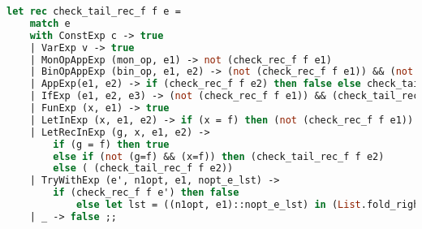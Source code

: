 \begin{lstlisting}[language=Caml, caption=Tail recursion for PicoML expressions]
let rec check_tail_rec_f f e =
    match e
    with ConstExp c -> true
    | VarExp v -> true
    | MonOpAppExp (mon_op, e1) -> not (check_rec_f f e1) 
    | BinOpAppExp (bin_op, e1, e2) -> (not (check_rec_f f e1)) && (not (check_rec_f f e2))
    | AppExp(e1, e2) -> if (check_rec_f f e2) then false else check_tail_rec_f f e1
    | IfExp (e1, e2, e3) -> (not (check_rec_f f e1)) && (check_tail_rec_f f e2) && (check_tail_rec_f f e3)
    | FunExp (x, e1) -> true 
    | LetInExp (x, e1, e2) -> if (x = f) then (not (check_rec_f f e1)) else ( (not (check_rec_f f e1)) && (check_tail_rec_f f e2))
    | LetRecInExp (g, x, e1, e2) ->
        if (g = f) then true 
        else if (not (g=f) && (x=f)) then (check_tail_rec_f f e2)
        else ( (check_tail_rec_f f e2)) 
    | TryWithExp (e', n1opt, e1, nopt_e_lst) ->
        if (check_rec_f f e') then false
            else let lst = ((n1opt, e1)::nopt_e_lst) in (List.fold_right (fun (intop, h) -> fun t -> (check_tail_rec_f f h) && t) lst true) 
    | _ -> false ;;
\end{lstlisting}